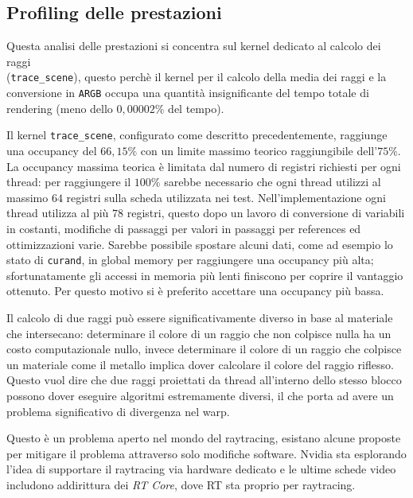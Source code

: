 \documentclass[12pt, twoside]{article}
\begin{document}
\subsection{Profiling delle prestazioni}

Questa analisi delle prestazioni si concentra sul kernel dedicato al calcolo
dei raggi \\(\texttt{trace\_scene}), questo perchè il kernel per il calcolo della
media dei raggi e la conversione in \texttt{ARGB} occupa una quantità
insignificante del tempo totale di rendering (meno dello $0,00002\%$ del
tempo).

Il kernel \texttt{trace\_scene}, configurato come descritto precedentemente,
raggiunge una occupancy del $66,15\%$ con un limite massimo teorico
raggiungibile dell'$75\%$.
La occupancy massima teorica è limitata dal numero di registri richiesti per
ogni thread: per raggiungere il $100\%$ sarebbe necessario che ogni thread
utilizzi al massimo $64$ registri sulla scheda utilizzata nei test.
Nell'implementazione ogni thread utilizza al più $78$ registri, questo dopo
un lavoro di conversione di variabili in costanti, modifiche di passaggi
per valori in passaggi per references ed ottimizzazioni varie.
Sarebbe possibile spostare alcuni dati, come ad esempio lo stato di
\texttt{curand}, in global memory per raggiungere una occupancy più alta;
sfortunatamente gli accessi in memoria più lenti finiscono per coprire il
vantaggio ottenuto.
Per questo motivo si è preferito accettare una occupancy più bassa.

Il calcolo di due raggi può essere significativamente diverso in base al
materiale che intersecano: determinare il colore di un raggio che non colpisce
nulla ha un costo computazionale nullo, invece determinare il colore di un
raggio che colpisce un materiale come il metallo implica dover calcolare il
colore del raggio riflesso.
Questo vuol dire che due raggi proiettati da thread all'interno dello stesso
blocco possono dover eseguire algoritmi estremamente diversi, il che porta
ad avere un problema significativo di divergenza nel warp.

Questo è un problema aperto nel mondo del raytracing, esistano alcune proposte
\cite{2011threadcompaction}\cite{2012simtmicroscheduling} per mitigare il
problema attraverso solo modifiche software.
Nvidia sta esplorando l'idea di supportare il raytracing via hardware
dedicato\cite{2022subwarpinterleaving} e le ultime schede video
includono addirittura dei \textit{RT Core}\cite{2018rtcores}, dove RT sta
proprio per raytracing.
\end{document}
